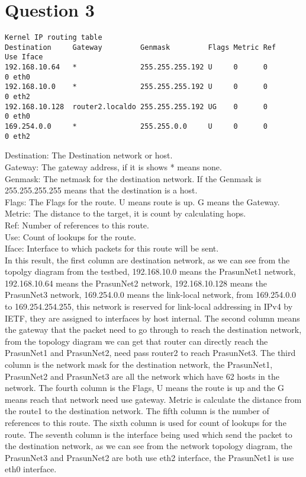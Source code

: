 \documentclass[a4paper,12pt]{article}
\begin{document}
\section*{Question 3}
\begin{verbatim}
Kernel IP routing table
Destination     Gateway         Genmask         Flags Metric Ref    Use Iface
192.168.10.64   *               255.255.255.192 U     0      0        0 eth0
192.168.10.0    *               255.255.255.192 U     0      0        0 eth2
192.168.10.128  router2.localdo 255.255.255.192 UG    0      0        0 eth0
169.254.0.0     *               255.255.0.0     U     0      0        0 eth2
\end{verbatim}
Destination: The Destination network or host.\\
Gateway: The gateway address, if it is shows * means none.\\
Genmask: The netmask for the destination network. If the Genmask is 255.255.255.255 means that the destination is a host.\\
Flags: The Flags for the route. U means route is up. G means the Gateway.\\
Metric: The distance to the target, it is count by calculating hops.\\
Ref: Number of references to this route.\\
Use: Count of lookups for the route.\\
Iface: Interface to which packets for this route will be sent.\\
In this result, the first column are destination network, as we can see from the topolgy diagram from the testbed, 192.168.10.0 means the PrasunNet1 network, 192.168.10.64 means the PrasunNet2 network, 192.168.10.128 means the PrasunNet3 network, 169.254.0.0 means the link-local network, from 169.254.0.0 to 169.254.254.255, this network is reserved for link-local addressing in IPv4 by IETF, they are assigned to interfaces by host internal. The second column means the gateway that the packet need to go through to reach the destination network, from the topology diagram we can get that router can directly reach the PrasunNet1 and PrasunNet2, need pass router2 to reach PrasunNet3. The third column is the network mask for the destination network, the PrasunNet1, PrasunNet2 and PrasunNet3 are all the network which have 62 hosts in the network. The fourth column is the Flags, U means the route is up and the G means reach that network need use gateway. Metric is calculate the distance from the route1 to the destination network. The fifth column is the number of references to this route. The sixth column is used for count of lookups for the route. The seventh column is the interface being used which send the packet to the destination network, as we can see from the network topology diagram, the PrasunNet3 and PrasunNet2 are both use eth2 interface, the PrasunNet1 is use eth0 interface.
\end{document}
